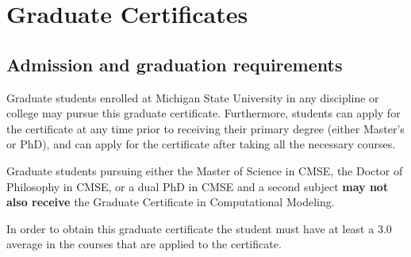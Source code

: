 \section{Graduate Certificates}
\label{sec:grad_certs}

\subsection{Admission and graduation requirements}

Graduate students enrolled at Michigan State University in any
discipline or college may pursue this graduate certificate.
Furthermore, students can apply for the certificate at any time prior
to receiving their primary degree (either Master’s or PhD), and can
apply for the certificate after taking all the necessary courses.

Graduate students pursuing either the Master of Science in CMSE, the
Doctor of Philosophy in CMSE, or a dual PhD in CMSE and a second
subject \textbf{may not also receive} the Graduate Certificate in
Computational Modeling.

In order to obtain this graduate certificate the student must have at
least a 3.0 average in the courses that are applied to the
certificate.

\newpage



\newpage

